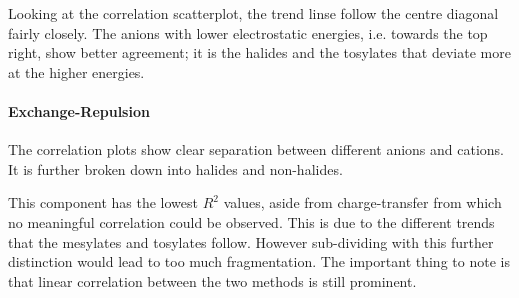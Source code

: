 Looking at the correlation scatterplot, the trend linse follow the centre diagonal fairly closely.
The anions with lower electrostatic energies, i.e. towards the top right, show better agreement; it is the halides and the tosylates that deviate more at the higher energies.

\paragraph{Exchange-Repulsion}
The correlation plots show clear separation between different anions and cations.
It is further broken down into halides and non-halides.

This component has the lowest $R^2$ values, aside from charge-transfer from which no meaningful correlation could be observed. 
This is due to the different trends that the mesylates and tosylates follow. 
However sub-dividing with this further distinction would lead to too much fragmentation. 
The important thing to note is that linear correlation between the two methods is still prominent.

